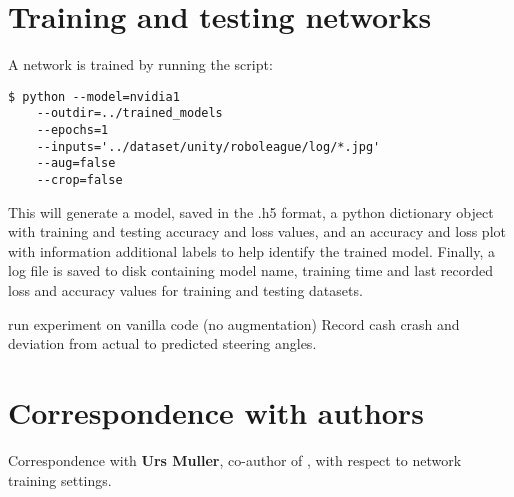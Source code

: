 \section{Training and testing networks}
A network is trained by running the script:
\begin{verbatim}
$ python --model=nvidia1
    --outdir=../trained_models
    --epochs=1
    --inputs='../dataset/unity/roboleague/log/*.jpg'
    --aug=false
    --crop=false    
\end{verbatim}
This will generate a model, saved in the .h5 format, a python dictionary object with training and testing accuracy and loss values, and an accuracy and loss plot with information additional labels to help identify the trained model. Finally, a log file is saved to disk containing model name, training time and last recorded loss and accuracy values for training and testing datasets.

run experiment on vanilla code (no augmentation)
Record cash crash and deviation from actual to predicted steering angles.

\section{Correspondence with authors}

Correspondence with \textbf{Urs Muller}, co-author of \cite{bojarski2016end}, with respect to network training settings.

